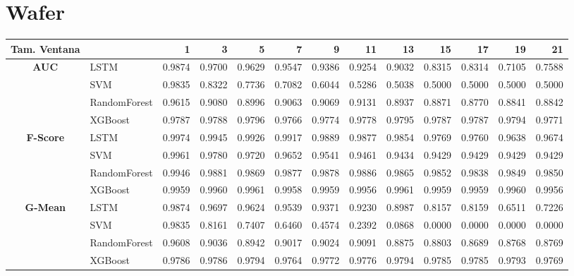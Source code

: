 \section{Wafer}
\begin{table}[h]
	\centering
	\begin{adjustbox}{max width=15cm}
		\begin{tabular}{|c|l|r|r|r|r|r|r|r|r|r|r|r|}
			\hline
			\textbf{Tam. Ventana}&         &      1  &      3  &      5  &      7  &      9  &      11 &      13 &      15 &      17 &      19 &      21 \\
			\hline
			\textbf{AUC} & LSTM &  0.9874 &  0.9700 &  0.9629 &  0.9547 &  0.9386 &  0.9254 &  0.9032 &  0.8315 &  0.8314 &  0.7105 &  0.7588 \\
			& SVM &  0.9835 &  0.8322 &  0.7736 &  0.7082 &  0.6044 &  0.5286 &  0.5038 &  0.5000 &  0.5000 &  0.5000 &  0.5000 \\
			& RandomForest &  0.9615 &  0.9080 &  0.8996 &  0.9063 &  0.9069 &  0.9131 &  0.8937 &  0.8871 &  0.8770 &  0.8841 &  0.8842 \\
			& XGBoost &  0.9787 &  0.9788 &  0.9796 &  0.9766 &  0.9774 &  0.9778 &  0.9795 &  0.9787 &  0.9787 &  0.9794 &  0.9771 \\
			\hline
			\textbf{F-Score} & LSTM &  0.9974 &  0.9945 &  0.9926 &  0.9917 &  0.9889 &  0.9877 &  0.9854 &  0.9769 &  0.9760 &  0.9638 &  0.9674 \\
			& SVM &  0.9961 &  0.9780 &  0.9720 &  0.9652 &  0.9541 &  0.9461 &  0.9434 &  0.9429 &  0.9429 &  0.9429 &  0.9429 \\
			& RandomForest &  0.9946 &  0.9881 &  0.9869 &  0.9877 &  0.9878 &  0.9886 &  0.9865 &  0.9852 &  0.9838 &  0.9849 &  0.9850 \\
			& XGBoost &  0.9959 &  0.9960 &  0.9961 &  0.9958 &  0.9959 &  0.9956 &  0.9961 &  0.9959 &  0.9959 &  0.9960 &  0.9956 \\
			\hline
			\textbf{G-Mean} & LSTM &  0.9874 &  0.9697 &  0.9624 &  0.9539 &  0.9371 &  0.9230 &  0.8987 &  0.8157 &  0.8159 &  0.6511 &  0.7226 \\
			& SVM &  0.9835 &  0.8161 &  0.7407 &  0.6460 &  0.4574 &  0.2392 &  0.0868 &  0.0000 &  0.0000 &  0.0000 &  0.0000 \\
			& RandomForest &  0.9608 &  0.9036 &  0.8942 &  0.9017 &  0.9024 &  0.9091 &  0.8875 &  0.8803 &  0.8689 &  0.8768 &  0.8769 \\
			& XGBoost &  0.9786 &  0.9786 &  0.9794 &  0.9764 &  0.9772 &  0.9776 &  0.9794 &  0.9785 &  0.9785 &  0.9793 &  0.9769 \\

\end{tabular}
\end{adjustbox}
\end{table}

